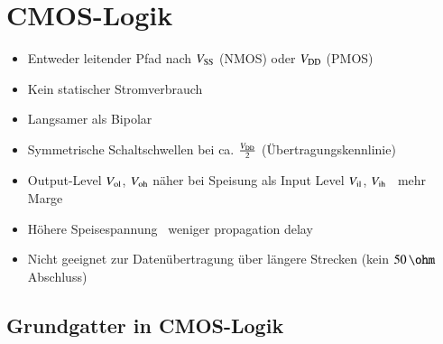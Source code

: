 \section{CMOS-Logik}

\begin{itemize}
    \item Entweder leitender Pfad nach $V_{\rm SS}$ (NMOS) oder $V_{\rm DD}$ (PMOS)
    \item Kein statischer Stromverbrauch
    \item Langsamer als Bipolar
    \item Symmetrische Schaltschwellen bei ca. $\frac{V_{\rm DD}}{2}$ (Übertragungskennlinie)
    \item Output-Level $V_{\rm ol}$, $V_{\rm oh}$ näher bei Speisung als Input Level $V_{\rm il}$, $V_{\rm ih}$ \textrightarrow\ mehr Marge
    \item Höhere Speisespannung \textrightarrow\ weniger propagation delay
    \item Nicht geeignet zur Datenübertragung über längere Strecken (kein $50 \, \ohm$ Abschluss)
\end{itemize}


\subsection{Grundgatter in CMOS-Logik}

